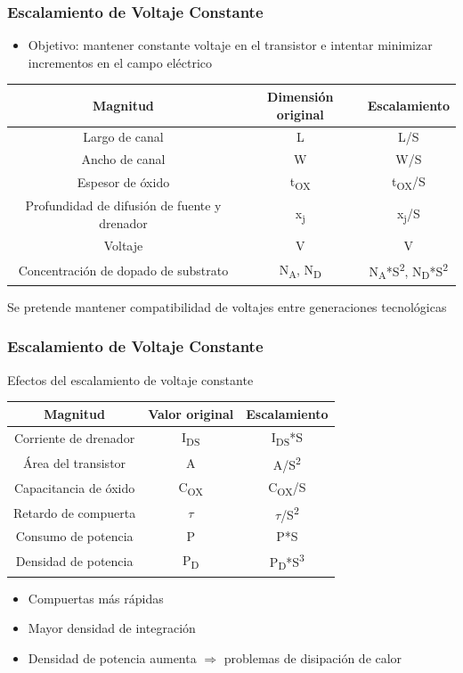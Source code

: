 \documentclass[t,aspectratio=169,10pt]{beamer}
\begin{document}
\begin{frame}
\frametitle{Escalamiento de Voltaje Constante}
\begin{itemize}
	\item Objetivo: mantener constante voltaje en el transistor e intentar minimizar incrementos en el campo eléctrico
\end{itemize}

\centering
\begin{tabular}{|c|c|c|}
	\hline \textbf{Magnitud} & \textbf{Dimensión original} & \textbf{Escalamiento} \\
	\hline Largo de canal & L & L/S \\
	\hline Ancho de canal & W & W/S \\
	\hline Espesor de óxido & t\textsubscript{OX} & t\textsubscript{OX}/S \\
	\hline Profundidad de difusión de fuente y drenador & x\textsubscript{j} & x\textsubscript{j}/S \\
	\hline Voltaje & V & V  \\
	\hline Concentración de dopado de substrato & N\textsubscript{A}, N\textsubscript{D} & N\textsubscript{A}*S\textsuperscript{2}, N\textsubscript{D}*S\textsuperscript{2} \\
	\hline 
\end{tabular}

\vspace{5mm}
\centering
Se pretende mantener compatibilidad de voltajes entre generaciones tecnológicas
\end{frame}


\begin{frame}
\frametitle{Escalamiento de Voltaje Constante}
\centering
Efectos del escalamiento de voltaje constante

\vspace{5mm}
\begin{tabular}{|c|c|c|}
	\hline \textbf{Magnitud} & \textbf{Valor original} & \textbf{Escalamiento} \\
	\hline Corriente de drenador & I\textsubscript{DS} & I\textsubscript{DS}*S\\
	\hline Área del transistor & A & A/S\textsuperscript{2} \\
	\hline Capacitancia de óxido & C\textsubscript{OX} & C\textsubscript{OX}/S \\
	\hline Retardo de compuerta & $\tau$ & $\tau$/S\textsuperscript{2} \\
	\hline Consumo de potencia & P & P*S\\
	\hline Densidad de potencia & P\textsubscript{D} & P\textsubscript{D}*S\textsuperscript{3} \\
	\hline
\end{tabular}

\vspace{5mm}
\begin{itemize}
	\item Compuertas más rápidas
	\item Mayor densidad de integración
	\item Densidad de potencia aumenta $\Rightarrow$ problemas de disipación de calor
\end{itemize}
\end{frame}
\end{document}
